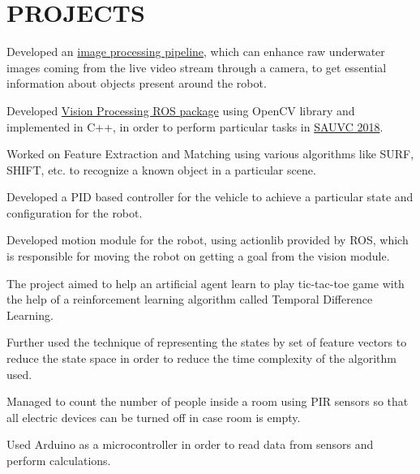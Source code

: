 \documentclass[]{deedy-resume-openfont}
\begin{document}
\section{PROJECTS}
\begin{tightemize}
\item Developed an \href{https://github.com/ksakash/auv2017-1/blob/IP/task_handler_layer/ip.md}{image processing pipeline}, which can enhance raw underwater images coming from the live video stream through a camera, to get essential information about objects present around the robot. 
\item Developed \href{https://github.com/ksakash/IP_SAUVC/}{Vision Processing ROS package} using OpenCV library and implemented in C++, in order to perform particular tasks in \href{https://sauvc.org/}{SAUVC 2018}.  
\item Worked on Feature Extraction and Matching using various algorithms like SURF, SHIFT, etc. to recognize a known object in a particular scene.
\item Developed a PID based controller for the vehicle to achieve a particular state and configuration for the robot.
\item Developed motion module for the robot, using actionlib provided by ROS, which is responsible for moving the robot on getting a goal from the vision module.
\end{tightemize}
\sectionsep

\begin{tightemize}
\item The project aimed to help an artificial agent learn to play tic-tac-toe game with the help of a  reinforcement learning algorithm called Temporal Difference Learning.
\item Further used the technique of representing the states by set of feature vectors to reduce the state space in order to reduce the time complexity of the algorithm used.
\end{tightemize}
\sectionsep

\begin{tightemize}
\item Managed to count the number of people inside a room using PIR sensors so that all electric devices can be turned off in case room is empty.
\item Used Arduino as a microcontroller in order to read data from sensors and perform  calculations.
\end{tightemize}
\end{document}
